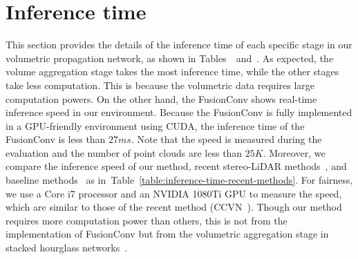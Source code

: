 \documentclass[letterpaper, 10 pt, conference]{ieeeconf}
\newcommand{\Tref}[1]{Table~\textcolor{blue}{\ref{#1}}}
\newcommand{\RNum}[1]{\uppercase\expandafter{\romannumeral #1\relax}}
\begin{document}
\section{Inference time}
\label{supp-sec:Inference time}
This section provides the details of the inference time of each specific stage in our volumetric propagation network, as shown in Tables~\textcolor{blue}{\RNum{2}}~and~\textcolor{blue}{\RNum{3}}. As expected, the volume aggregation stage takes the most inference time, while the other stages take less computation. This is because the volumetric data requires large computation powers. 
On the other hand, the FusionConv shows real-time inference speed in our environment. Because the FusionConv is fully implemented in a GPU-friendly environment using CUDA, the inference time of the FusionConv is less than $27 ms$. Note that the speed is measured during the evaluation and the number of point clouds are less than $25K$. Moreover, we compare the inference speed of our method, recent stereo-LiDAR methods~\cite{stereolidar_00,stereolidar_norm_costV_ccvn}, and baseline methods~\cite{gcnet,psmnet} as in~\Tref{table:inference-time-recent-methods}. For fairness, we use a Core i7 processor and an NVIDIA 1080Ti GPU to measure the speed, which are similar to those of the recent method (CCVN~\cite{stereolidar_norm_costV_ccvn}). Though our method requires more computation power than others, this is not from the implementation of FusionConv but from the volumetric aggregation stage in stacked hourglass networks~\cite{hourglass,psmnet}. 
\end{document}
